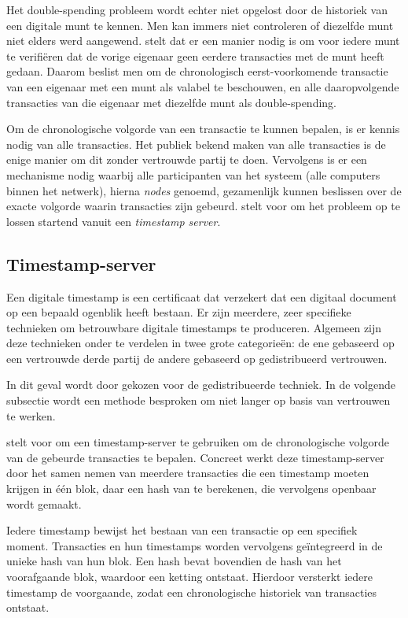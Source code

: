 	Het double-spending probleem wordt echter niet opgelost door de historiek van een digitale munt te kennen. Men kan immers niet controleren of diezelfde munt niet elders werd aangewend. \textcite{Nakamoto2008} stelt dat er een manier nodig is om voor iedere munt te verifiëren dat de vorige eigenaar geen eerdere transacties met de munt heeft gedaan. Daarom beslist men om de chronologisch eerst-voorkomende transactie van een eigenaar met een munt als valabel te beschouwen, en alle daaropvolgende transacties van die eigenaar met diezelfde munt als double-spending. 
			
	Om de chronologische volgorde van een transactie te kunnen bepalen, is er kennis nodig van alle transacties. Het publiek bekend maken van alle transacties is de enige manier om dit zonder vertrouwde partij te doen. Vervolgens is er een mechanisme nodig waarbij alle participanten van het systeem (alle computers binnen het netwerk), hierna \textit{nodes} genoemd, gezamenlijk kunnen beslissen over de exacte volgorde waarin transacties zijn gebeurd. \textcite{Nakamoto2008} stelt voor om het probleem op te lossen startend vanuit een \textit{timestamp server}. 
			
	\subsection{Timestamp-server}
	Een digitale timestamp is een certificaat dat verzekert dat een digitaal document op een bepaald ogenblik heeft bestaan. Er zijn meerdere, zeer specifieke technieken om betrouwbare digitale timestamps te produceren. Algemeen zijn deze technieken onder te verdelen in twee grote categorieën: de ene gebaseerd op een vertrouwde derde partij de andere gebaseerd op gedistribueerd vertrouwen. ~\autocite{Nakamoto2008}
	
	In dit geval wordt door \textcite{Nakamoto2008} gekozen voor de gedistribueerde techniek. In de volgende subsectie wordt een methode besproken om niet langer op basis van vertrouwen te werken.
	
	\textcite{Nakamoto2008} stelt voor om een timestamp-server te gebruiken om de chronologische volgorde van de gebeurde transacties te bepalen.  Concreet werkt deze timestamp-server door het samen nemen van meerdere transacties die een timestamp moeten krijgen in één blok, daar een hash van te berekenen, die vervolgens openbaar wordt gemaakt.
	
	Iedere timestamp bewijst het bestaan van een transactie op een specifiek moment. Transacties en hun timestamps worden vervolgens geïntegreerd in de unieke hash van hun blok. Een hash bevat bovendien de hash van het voorafgaande blok, waardoor een ketting ontstaat. Hierdoor versterkt iedere timestamp  de voorgaande, zodat een chronologische historiek van transacties ontstaat.
	
